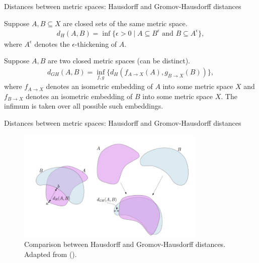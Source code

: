 \documentclass[xcolor={dvipsnames,svgnames}]{beamer}
\begin{document}
\begin{frame}{Distances between metric spaces: Hausdorff and Gromov-Hausdorff distances}
\begin{defn}
    Suppose $A, B \subseteq X$ are closed sets of the same metric space.
    \begin{align}
        d_H(A, B) =\inf\{\epsilon >0 \mid A\subseteq B^\epsilon \text{ and } B\subseteq A^\epsilon\},
    \end{align}
    where $A^\epsilon$ denotes the $\epsilon$-thickening of $A$.
\end{defn}

\begin{defn}
Suppose $A, B$ are two closed metric spaces (can be distinct).
    \begin{align}
        d_{GH}(A,B) =\inf_{f,g}\{d_H(f_{A\to X}(A), g_{B\to X}(B))\},
    \end{align}
where $f_{A\to X}$ denotes an isometric embedding of $A$ into some metric space $X$ and $f_{B\to X}$ denotes an isometric embedding of $B$ into some metric space $X$. The infimum is taken over all possible such embeddings. 
\end{defn}
\end{frame}
\begin{frame}{Distances between metric spaces: Hausdorff and Gromov-Hausdorff distances}
   \begin{figure}[H]
   \label{matching}
        \centering \includegraphics[width=0.8\textwidth]{figures/gomorov-hausdorf.png}
            \caption{Comparison between Hausdorff and Gromov-Hausdorff distances. Adapted from (\cite{chazal_introduction_2021}).}
    \end{figure}
\end{frame}
\end{document}
